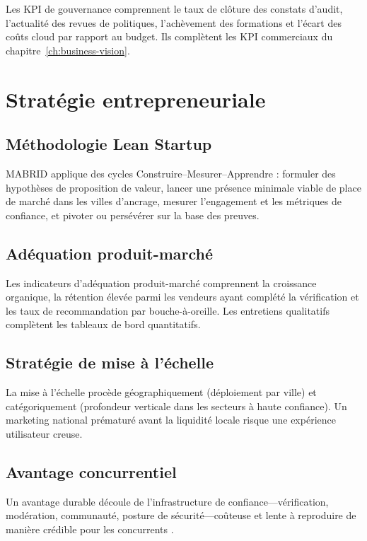 Les KPI de gouvernance comprennent le taux de clôture des constats d'audit, l'actualité des revues de politiques, l'achèvement des formations et l'écart des coûts cloud par rapport au budget. Ils complètent les KPI commerciaux du chapitre~\ref{ch:business-vision}.

\section{Stratégie entrepreneuriale}

\subsection{Méthodologie Lean Startup}

MABRID applique des cycles Construire--Mesurer--Apprendre \parencite{ries2011lean} : formuler des hypothèses de proposition de valeur, lancer une présence minimale viable de place de marché dans les villes d'ancrage, mesurer l'engagement et les métriques de confiance, et pivoter ou persévérer sur la base des preuves.

\subsection{Adéquation produit-marché}

Les indicateurs d'adéquation produit-marché comprennent la croissance organique, la rétention élevée parmi les vendeurs ayant complété la vérification et les taux de recommandation par bouche-à-oreille. Les entretiens qualitatifs complètent les tableaux de bord quantitatifs.

\subsection{Stratégie de mise à l'échelle}

La mise à l'échelle procède géographiquement (déploiement par ville) et catégoriquement (profondeur verticale dans les secteurs à haute confiance). Un marketing national prématuré avant la liquidité locale risque une expérience utilisateur creuse.

\subsection{Avantage concurrentiel}

Un avantage durable découle de l'infrastructure de confiance---vérification, modération, communauté, posture de sécurité---coûteuse et lente à reproduire de manière crédible pour les concurrents \parencite{kim2005blueocean}.

